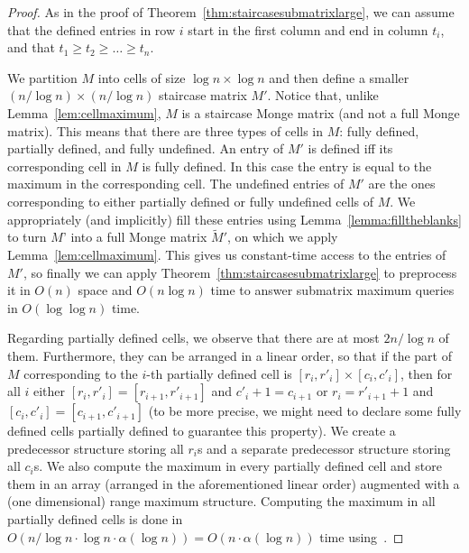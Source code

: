 \documentclass{llncs}
\begin{document}
\begin{proof}
As in the proof of Theorem~\ref{thm:staircasesubmatrixlarge}, we can assume that the defined entries in row $i$ 
start in the first column and end in column $t_{i}$, and that  $t_{1}\ge t_{2} \ge \ldots \ge t_{n}$.

We partition $M$ into cells of size $\log n \times \log n$ and then define a  smaller  $(n/\log n) \times (n/\log n)$
staircase matrix $M'$. Notice that, unlike Lemma~\ref{lem:cellmaximum}, $M$ is a staircase Monge matrix (and not a full Monge matrix). This means that there are three types of cells in $M$: fully defined, partially defined, and fully undefined. An entry of $M'$ is defined iff its corresponding cell in $M$ is
fully defined. In this case the entry is equal to the maximum in the corresponding
cell. The undefined entries of $M'$ are the ones corresponding to either partially defined or fully undefined cells of $M$. 
We appropriately (and implicitly)  fill these entries using Lemma~\ref{lemma:filltheblanks} to turn $M$' into a full Monge
matrix $\widetilde M'$, on which we apply Lemma~\ref{lem:cellmaximum}. This gives us
constant-time access to the entries of $M'$, so finally we can apply Theorem~\ref{thm:staircasesubmatrixlarge}
to preprocess it in $O(n)$ space and $O(n\log n)$ time to answer submatrix maximum queries
in $O(\log\log n)$ time.

Regarding partially defined
cells, we observe that there are at most $2n/\log n$ of them. Furthermore, they can be arranged in a linear order, so that if the part of $M$
corresponding to the $i$-th partially defined cell is $[r_{i},r'_{i}] \times [c_{i},c'_{i}]$, then
for all $i$ either $[r_{i},r'_{i}]=[r_{i+1},r'_{i+1}]$ and $c'_{i}+1=c_{i+1}$ or $r_{i}=r'_{i+1}+1$ and $[c_{i},c'_{i}]=[c_{i+1},c'_{i+1}]$
(to be more precise, we might need to declare some fully defined cells partially defined to
guarantee this property). We create a predecessor structure storing all $r_{i}$s and a separate
predecessor structure storing all $c_{i}$s. We also compute the maximum in every partially
defined cell and store them in an array (arranged in the aforementioned linear order) augmented
with a (one dimensional) range maximum structure. Computing the maximum in all partially defined
cells is done in $O(n/\log n \cdot \log n \cdot \alpha(\log n))=O(n\cdot \alpha(\log n))$ time using~\cite{KK89}.


\end{proof}
\end{document}
